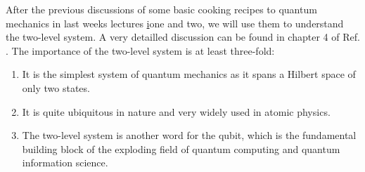 After the previous discussions of some basic cooking recipes to quantum mechanics in last weeks lectures \href{https://www.authorea.com/326007/wyOpqBcLPiiNhswBbwDHbA}{i}one and two, we will use them to understand the two-level system. A very detailled discussion can be found in chapter 4 of Ref. \cite{1}. The importance of the two-level system is at least three-fold:
\begin{enumerate}
\item It is the simplest system of quantum mechanics as it spans a Hilbert space of only two states.
\item It is quite ubiquitous in nature and very widely used in atomic physics.
\item The two-level system is another word for the qubit, which is the fundamental building block of the exploding field of quantum computing and quantum information science.
\end{enumerate}

